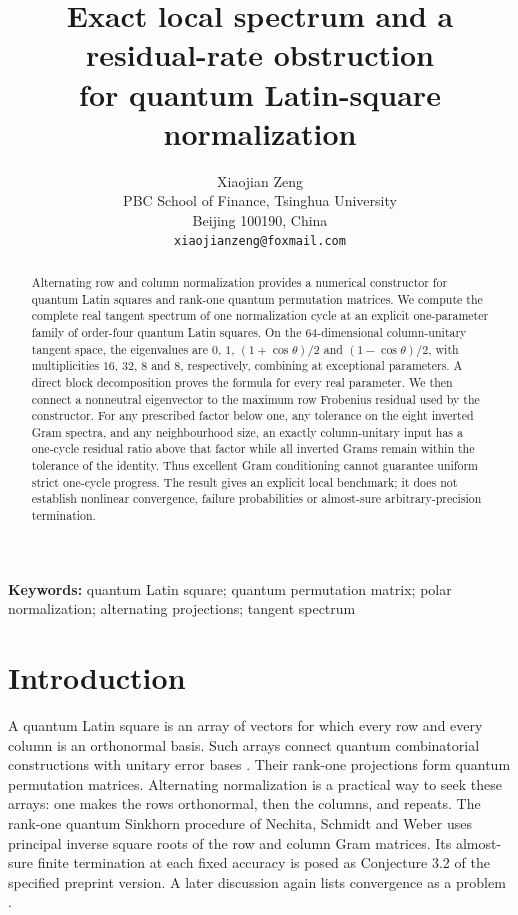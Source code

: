 \documentclass[11pt,a4paper]{article}
\title{Exact local spectrum and a residual-rate obstruction\texorpdfstring{\\}{ }for quantum Latin-square normalization}
\author{Xiaojian Zeng\\[2pt]
\small PBC School of Finance, Tsinghua University\\
\small Beijing 100190, China\\
\small \texttt{xiaojianzeng@foxmail.com}}
\date{}
\begin{document}
\maketitle

\begin{abstract}
Alternating row and column normalization provides a numerical constructor for quantum Latin squares and rank-one quantum permutation matrices. We compute the complete real tangent spectrum of one normalization cycle at an explicit one-parameter family of order-four quantum Latin squares. On the 64-dimensional column-unitary tangent space, the eigenvalues are $0$, $1$, $(1+\cos\theta)/2$ and $(1-\cos\theta)/2$, with multiplicities $16$, $32$, $8$ and $8$, respectively, combining at exceptional parameters. A direct block decomposition proves the formula for every real parameter. We then connect a nonneutral eigenvector to the maximum row Frobenius residual used by the constructor. For any prescribed factor below one, any tolerance on the eight inverted Gram spectra, and any neighbourhood size, an exactly column-unitary input has a one-cycle residual ratio above that factor while all inverted Grams remain within the tolerance of the identity. Thus excellent Gram conditioning cannot guarantee uniform strict one-cycle progress. The result gives an explicit local benchmark; it does not establish nonlinear convergence, failure probabilities or almost-sure arbitrary-precision termination.
\end{abstract}

\noindent\textbf{Keywords:} quantum Latin square; quantum permutation matrix; polar normalization; alternating projections; tangent spectrum

\section{Introduction}

A quantum Latin square is an array of vectors for which every row and every column is an orthonormal basis. Such arrays connect quantum combinatorial constructions with unitary error bases \cite{MustoVicary2016}. Their rank-one projections form quantum permutation matrices. Alternating normalization is a practical way to seek these arrays: one makes the rows orthonormal, then the columns, and repeats. The rank-one quantum Sinkhorn procedure of Nechita, Schmidt and Weber \cite{NechitaSchmidtWeber2023} uses principal inverse square roots of the row and column Gram matrices. Its almost-sure finite termination at each fixed accuracy is posed as Conjecture 3.2 of the specified preprint version. A later discussion again lists convergence as a problem \cite[Problem 3.13]{Weber2023}.
\end{document}
